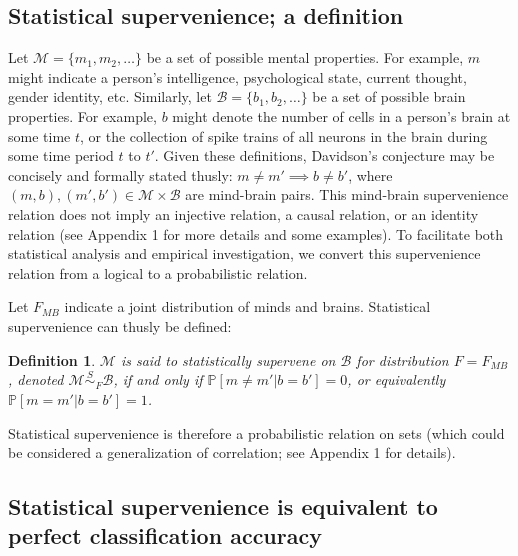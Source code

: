 \documentclass{article}
\newcommand{\mB}{\mathcal{B}}
\newcommand{\mM}{\mathcal{M}}
\newcommand{\PP}{\mathbb{P}}           %
\providecommand{\mc}[1]{\mathcal{#1}}
\newtheorem{defi}{Definition}
\begin{document}
\subsection*{Statistical supervenience; a definition} %

\noindent Let $\mc{M}=\{m_1, m_2, \ldots\}$ be a set of possible mental properties. For example, $m$ might indicate a person's intelligence, psychological state, current thought, gender identity, etc.   Similarly, let $\mc{B}=\{b_1,b_2,\ldots\}$ be a set of possible brain properties.  For example, $b$ might denote the number of cells in a person's brain at some time $t$, or the collection of spike trains of all neurons in the brain during some time period $t$ to $t'$. Given these definitions, Davidson's conjecture may be concisely and formally stated thusly:  $m \neq m' \implies b \neq b'$, where $(m,b), (m',b') \in \mc{M} \times \mc{B}$ are mind-brain pairs.  This mind-brain supervenience relation does not imply an injective relation, a causal relation, or an identity relation (see Appendix 1 for more details and some examples).  To facilitate both statistical analysis and empirical investigation, we convert this supervenience relation from a logical to a probabilistic relation.  

Let $F_{MB}$ indicate a joint distribution of minds and brains. Statistical supervenience can thusly be defined:
\begin{defi}
\label{def1} 
$\mM$ is said to \textit{statistically supervene} on $\mB$ for distribution $F=F_{MB}$, denoted $\mM \overset{S}{\sim}_F \mB$, if and only if $\PP[m \neq m' | b=b']=0$, or equivalently $\PP[m = m' | b = b']=1$. 
\end{defi}
\noindent Statistical supervenience is therefore a probabilistic relation on sets (which could be considered a generalization of correlation; see Appendix 1 for details).  



\subsection*{Statistical supervenience is equivalent to perfect classification accuracy} %
\label{sub:theoretical_results}
\end{document}

